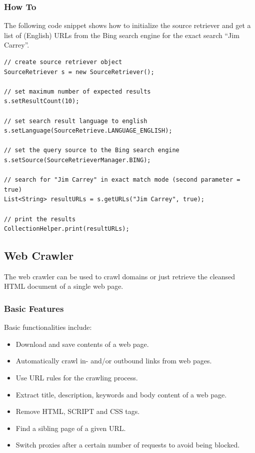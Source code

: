 \documentclass[a4paper,twoside]{book}      %
\begin{document}
\subsubsection{How To}
\label{sec:howto}
The following code snippet shows how to initialize the source retriever and get a list of (English) URLs from the Bing search engine for the exact search ``Jim Carrey''.
\begin{codelisting}
\begin{lstlisting}[caption=Retrieving result URLs from a search engine.,frame=tb]
// create source retriever object
SourceRetriever s = new SourceRetriever();
		
// set maximum number of expected results 
s.setResultCount(10);
		
// set search result language to english
s.setLanguage(SourceRetrieve.LANGUAGE_ENGLISH);
		
// set the query source to the Bing search engine 
s.setSource(SourceRetrieverManager.BING);
		
// search for "Jim Carrey" in exact match mode (second parameter = true)
List<String> resultURLs = s.getURLs("Jim Carrey", true);
		
// print the results
CollectionHelper.print(resultURLs);	
\end{lstlisting}
\end{codelisting}


\subsection{Web Crawler}
The web crawler can be used to crawl domains or just retrieve the cleansed HTML document of a single web page.

\subsubsection{Basic Features}
Basic functionalities include:
\begin{itemize}
\item Download and save contents of a web page.
\item Automatically crawl in- and/or outbound links from web pages.
\item Use URL rules for the crawling process.
\item Extract title, description, keywords and body content of a web page.
\item Remove HTML, SCRIPT and CSS tags.
\item Find a sibling page of a given URL.
\item Switch proxies after a certain number of requests to avoid being blocked.
\end{itemize}
\end{document}
